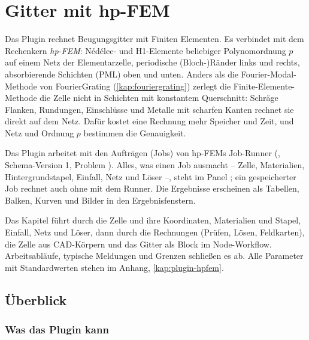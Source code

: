 \chapter{Gitter mit hp-FEM}\label{kap:hpfem}

Das Plugin  rechnet Beugungsgitter mit Finiten Elementen. Es verbindet \produkt{}
mit dem Rechenkern \emph{hp-FEM}: Nédélec- und H1-Elemente beliebiger Polynomordnung $p$ auf einem
Netz der Elementarzelle, periodische (Bloch-)Ränder links und rechts, absorbierende Schichten
(PML) oben und unten. Anders als die Fourier-Modal-Methode von FourierGrating
(\autoref{kap:fouriergrating}) zerlegt die Finite-Elemente-Methode die Zelle nicht in Schichten
mit konstantem Querschnitt: Schräge Flanken, Rundungen, Einschlüsse und Metalle mit scharfen
Kanten rechnet sie direkt auf dem Netz. Dafür kostet eine Rechnung mehr Speicher und Zeit, und
Netz und Ordnung $p$ bestimmen die Genauigkeit.

Das Plugin arbeitet mit den Aufträgen (Jobs) von hp-FEMs Job-Runner (,
Schema-Version 1, Problem ). Alles, was einen Job ausmacht -- Zelle, Materialien,
Hintergrundstapel, Einfall, Netz und Löser --, steht im Panel ; ein gespeicherter Job
rechnet auch ohne \produkt{} mit dem Runner. Die Ergebnisse erscheinen als Tabellen, Balken,
Kurven und Bilder in den Ergebnisfenstern.

Das Kapitel führt durch die Zelle und ihre Koordinaten, Materialien und Stapel, Einfall, Netz
und Löser, dann durch die Rechnungen (Prüfen, Lösen, Feldkarten), die Zelle aus CAD-Körpern und
das Gitter als Block im Node-Workflow. Arbeitsabläufe, typische Meldungen und Grenzen schließen
es ab. Alle Parameter mit Standardwerten stehen im Anhang, \autoref{kap:plugin-hpfem}.

\section{Überblick}\label{sec:hp-ueberblick}

\subsection{Was das Plugin kann}


